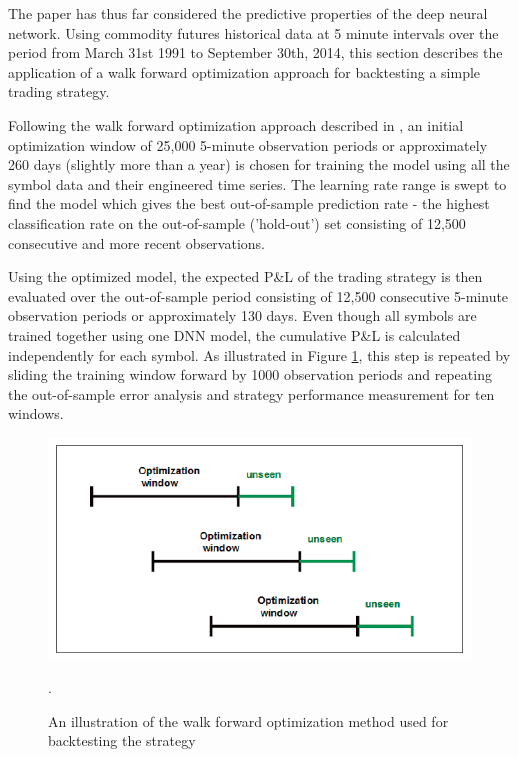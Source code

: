 \documentclass{article}
\begin{document}
The paper has thus far considered the predictive properties of the deep neural
network. Using commodity futures historical data at 5 minute intervals over the
period from March 31st 1991 to September 30th, 2014, this section describes the
application of a walk forward optimization approach for backtesting a simple
trading strategy.


Following the walk forward optimization approach described in \cite{Tomasini2011}, an initial optimization window of 25,000 5-minute observation periods or approximately 260 days (slightly more than a year) is chosen for training the model using all the symbol data and their engineered time series. The learning rate range is swept to find the model which gives the best out-of-sample
prediction rate - the highest classification rate on the out-of-sample ('hold-out') set consisting of 12,500 consecutive and more recent observations.

Using the optimized model, the expected P\&L of the trading strategy is then
evaluated over the out-of-sample period consisting of 12,500 consecutive 5-minute observation periods or approximately 130 days. Even though all symbols
are trained together using one DNN model, the cumulative P\&L is calculated independently for each
symbol.  As illustrated
in Figure \ref{fig:back_testing}, this step is repeated by sliding the training window forward by 1000 observation periods and repeating the out-of-sample error analysis and strategy performance measurement for ten windows.

\vspace{20pt}
\begin{figure}[h]
\centering
\includegraphics[scale=0.5]{figures/back_testing.png}
\caption{An illustration of the walk forward optimization method used for
backtesting the strategy}.
\label{fig:back_testing}
\end{figure}
\vspace{6pt}
\end{document}
